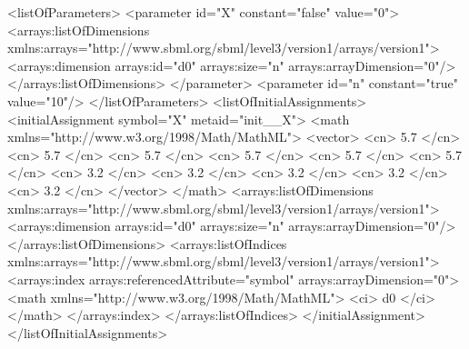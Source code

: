 \begin{example}
    
<listOfParameters>
    <parameter id="X" constant="false" value="0">
        <arrays:listOfDimensions
            xmlns:arrays="http://www.sbml.org/sbml/level3/version1/arrays/version1">
            <arrays:dimension arrays:id="d0" arrays:size="n" arrays:arrayDimension="0"/>
        </arrays:listOfDimensions>
    </parameter>
    <parameter id="n" constant="true" value="10"/>
</listOfParameters>
<listOfInitialAssignments>
    <initialAssignment symbol="X" metaid="init__X">
        <math xmlns="http://www.w3.org/1998/Math/MathML">
            <vector>
                <cn> 5.7 </cn>
                <cn> 5.7 </cn>
                <cn> 5.7 </cn>
                <cn> 5.7 </cn>
                <cn> 5.7 </cn>
                <cn> 5.7 </cn>
                <cn> 3.2 </cn>
                <cn> 3.2 </cn>
                <cn> 3.2 </cn>
                <cn> 3.2 </cn>
                <cn> 3.2 </cn>
            </vector>
        </math>
        <arrays:listOfDimensions
            xmlns:arrays="http://www.sbml.org/sbml/level3/version1/arrays/version1">
            <arrays:dimension arrays:id="d0" arrays:size="n" arrays:arrayDimension="0"/>
        </arrays:listOfDimensions>
        <arrays:listOfIndices
            xmlns:arrays="http://www.sbml.org/sbml/level3/version1/arrays/version1">
            <arrays:index arrays:referencedAttribute="symbol" arrays:arrayDimension="0">
                <math xmlns="http://www.w3.org/1998/Math/MathML">
                    <ci> d0 </ci>
                </math>
            </arrays:index>
        </arrays:listOfIndices>
    </initialAssignment>
</listOfInitialAssignments>
\end{example}



